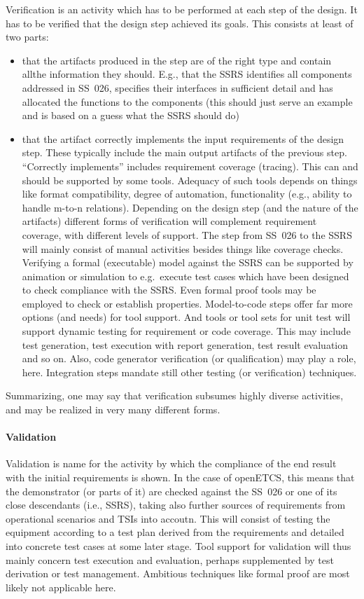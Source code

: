 \documentclass{template/openetcs_report}
\begin{document}
Verification is an activity which has to be performed at each step of
the design. It has to be verified that the design step achieved its
goals. This consists at least of two parts:
\begin{itemize}
\item that the artifacts produced in the step are of the right type
  and contain allthe information they should. E.g., that the SSRS
  identifies all components addressed in SS~026, specifies their
  interfaces in sufficient detail and has allocated the functions to
  the components (this should just serve an example and is based on a
  guess what the SSRS should do)
\item that the artifact correctly implements the input requirements of
  the design step. These typically include the main output artifacts
  of the previous step. ``Correctly implements'' includes requirement
  coverage (tracing). This can and should be supported by some
  tools. Adequacy of such tools depends on things like format
  compatibility, degree of automation, functionality (e.g., ability to
  handle m-to-n relations). Depending on the design step (and the
  nature of the artifacts) different forms of verification will
  complement requirement coverage, with different levels of
  support. The step from SS~026 to the SSRS will mainly consist of
  manual activities besides things like coverage checks. Verifying a
  formal (executable) model against the SSRS can be supported by
  animation or simulation to e.g.\ execute test cases which have been
  designed to check compliance with the SSRS. Even formal proof tools
  may be employed to check or establish properties. Model-to-code steps
  offer far more options (and needs) for tool support. And tools or
  tool sets for unit test will support dynamic testing for requirement
  or code coverage. This may include test generation, test execution
  with report generation, test result evaluation and so on. Also, code
  generator verification (or qualification) may play a role,
  here. Integration steps mandate still other testing (or
  verification) techniques.
\end{itemize}
Summarizing, one may say that verification subsumes highly diverse
activities, and may be realized in very many different forms.

\paragraph{Validation}
Validation is name for the activity by which the compliance of the end
result with the initial requirements is shown. In the case of
openETCS, this means that the demonstrator (or parts of it) are
checked against the SS~026 or one of its close descendants (i.e.,
SSRS), taking also further sources of requirements from operational
scenarios and TSIs into accoutn. This will consist of testing the
equipment according to a test plan derived from the requirements and
detailed into concrete test cases at some later stage. Tool support
for validation will thus mainly concern test execution and evaluation,
perhaps supplemented by test derivation or test management. Ambitious
techniques like formal proof are most likely not applicable here.
\end{document}

